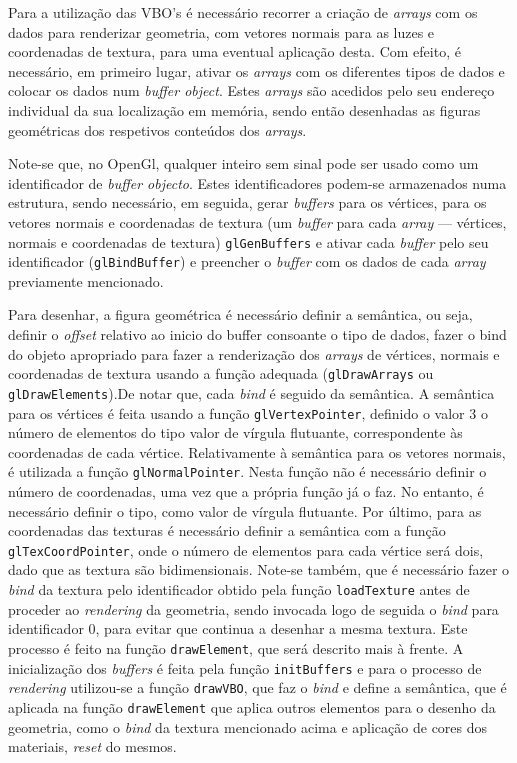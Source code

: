 Para a utilização das VBO's é necessário recorrer a criação de \emph{arrays} com
os dados para renderizar geometria, com vetores normais para as luzes
e coordenadas de textura, para uma eventual aplicação desta. Com efeito,
é necessário, em primeiro lugar, ativar os \emph{arrays} com os diferentes tipos
de dados e colocar os dados num \emph{buffer object}. Estes \emph{arrays} são
acedidos pelo seu endereço individual da sua localização em memória, sendo então
desenhadas as figuras geométricas dos respetivos conteúdos dos \emph{arrays}.


Note-se que, no OpenGl, qualquer inteiro sem sinal pode ser usado como um
identificador de \emph{buffer objecto}. Estes identificadores podem-se
armazenados numa estrutura, sendo necessário, em seguida, gerar \emph{buffers}
para os vértices, para os vetores normais e coordenadas de textura (um
\emph{buffer} para cada \emph{array} --- vértices, normais e coordenadas de
textura) \texttt{glGenBuffers} e ativar cada \emph{buffer} pelo seu
identificador (\texttt{glBindBuffer}) e preencher o \emph{buffer} com os dados
de cada \emph{array} previamente mencionado.


Para desenhar, a figura geométrica é necessário definir a semântica, ou seja,
definir o \emph{offset} relativo ao inicio do buffer consoante o tipo de dados,
fazer o bind do objeto apropriado para fazer a renderização dos \emph{arrays} de
vértices, normais e coordenadas de textura usando a função adequada
(\texttt{glDrawArrays} ou \texttt{glDrawElements}).De notar que, cada
\emph{bind} é seguido da semântica. A semântica para os vértices é feita usando
a função \texttt{glVertexPointer}, definido o valor 3 o número de elementos do
tipo valor de vírgula flutuante, correspondente às coordenadas de cada vértice.
Relativamente à semântica para os vetores normais, é utilizada a função
\texttt{glNormalPointer}. Nesta função não é necessário definir o número de
coordenadas, uma vez que a própria função já o faz. No entanto, é necessário
definir o tipo, como valor de vírgula flutuante. Por último, para as coordenadas
das texturas é necessário definir a semântica com a função
\texttt{glTexCoordPointer}, onde o número de elementos para cada vértice será
dois, dado que as textura são bidimensionais. Note-se também, que é necessário
fazer o \emph{bind} da textura pelo identificador obtido pela
função \texttt{loadTexture} antes de proceder ao \emph{rendering} da geometria,
sendo invocada logo de seguida o \emph{bind} para identificador 0, para evitar
que continua a desenhar a mesma textura. Este processo é feito na função
\texttt{drawElement}, que será descrito mais à frente. A inicialização dos
\emph{buffers} é feita pela função \texttt{initBuffers} e para o processo de
\emph{rendering} utilizou-se a função \texttt{drawVBO}, que faz o \emph{bind}
e define a semântica, que é aplicada na função \texttt{drawElement} que aplica
outros elementos para o desenho da geometria, como o \emph{bind} da textura
mencionado acima e aplicação de cores dos materiais, \emph{reset} do mesmos.  


